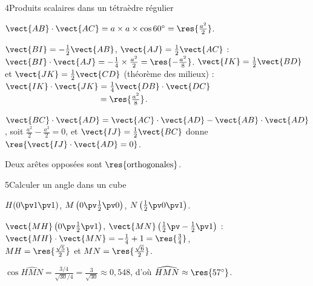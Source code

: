 \begin{deuxcolonnes}
\begin{corrige}{4}{Produits scalaires dans un tétraèdre régulier}
\begin{questions}
  \item $\vect{AB}\cdot\vect{AC}=a\times a\times\cos60^\circ=\res{\tfrac{a^2}{2}}$.
  \item $\vect{BI}=-\frac12\vect{AB}$, $\vect{AJ}=\frac12\vect{AC}$ : $\vect{BI}\cdot\vect{AJ}=-\frac14\times\frac{a^2}2=\res{-\tfrac{a^2}{8}}$.
    $\vect{IK}=\frac12\vect{BD}$ et $\vect{JK}=\frac12\vect{CD}$ (théorème des milieux) :\\
    $\vect{IK}\cdot\vect{JK}=\frac14\vect{DB}\cdot\vect{DC}$\\ $\phantom{\vect{IK}\cdot\vect{JK}}=\res{\tfrac{a^2}{8}}$.
  \item $\vect{BC}\cdot\vect{AD}=\vect{AC}\cdot\vect{AD}-\vect{AB}\cdot\vect{AD}$, soit $\frac{a^2}2-\frac{a^2}2=0$, et
    $\vect{IJ}=\frac12\vect{BC}$ donne $\res{\vect{IJ}\cdot\vect{AD}=0}$.
  \item Deux arêtes opposées sont $\res{\text{orthogonales}}$.
\end{questions}
\end{corrige}

\begin{corrige}{5}{Calculer un angle dans un cube}
\begin{questions}
  \item $H(0\pv1\pv1)$, $M\left(0\pv\frac12\pv0\right)$, $N\left(\frac12\pv0\pv1\right)$.
  \item $\vect{MH}\left(0\pv\frac12\pv1\right)$, $\vect{MN}\left(\frac12\pv-\frac12\pv1\right)$ :\\
    $\vect{MH}\cdot\vect{MN}=-\frac14+1=\res{\tfrac34}$,\\ $MH=\res{\tfrac{\sqrt5}{2}}$ et $MN=\res{\tfrac{\sqrt6}{2}}$.
  \item $\cos\widehat{HMN}=\frac{3/4}{\sqrt{30}/4}=\frac{3}{\sqrt{30}}\approx0{,}548$, d'où $\widehat{HMN}\approx\res{57^\circ}$.
\end{questions}
\end{corrige}


\end{deuxcolonnes}
